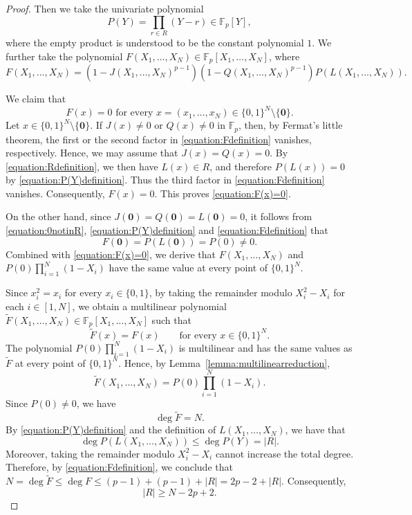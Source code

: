 \documentclass[10pt,a4paper]{amsart}
\begin{document}
\begin{proof}
Then we take the univariate polynomial
\begin{equation}\label{equation:P(Y)definition}
P(Y)=\prod_{r\in R}(Y-r)\in\mathbb F_p[Y],
\end{equation}
where the empty product is understood to be the constant polynomial $1$.
We further take the polynomial $F(X_1,\ldots,X_N) \in \mathbb{F}_p[X_1,\ldots,X_N]$, where \begin{equation}\label{equation:Fdefinition}
F(X_1,\ldots,X_N)=
\left(1-J(X_1,\ldots,X_N)^{p-1}\right)
\left(1-Q(X_1,\ldots,X_N)^{p-1}\right)
P(L(X_1,\ldots,X_N)).
\end{equation}


We claim that
\begin{equation}\label{equation:F(x)=0}
F(x)=0\mbox{ for every } x=(x_1,\ldots,x_N)\in\{0,1\}^N\setminus\{\mathbf 0\}.
\end{equation}
Let $x\in\{0,1\}^N\setminus\{\mathbf 0\}$. If $J(x)\ne0$ or
$Q(x)\ne0$ in $\mathbb F_p$, then, by Fermat's
little theorem, the first or the second factor in
\eqref{equation:Fdefinition} vanishes, respectively. Hence, we may assume that $J(x)=Q(x)=0$. By
\eqref{equation:Rdefinition}, we then have $L(x)\in R$, and therefore
$P(L(x))=0$ by \eqref{equation:P(Y)definition}. Thus the third factor
in \eqref{equation:Fdefinition} vanishes. Consequently, $F(x)=0$. This proves \eqref{equation:F(x)=0}.

On the other hand, since $J(\mathbf 0)=Q(\mathbf 0)=L(\mathbf 0)=0$, it follows from \eqref{equation:0notinR}, \eqref{equation:P(Y)definition} and \eqref{equation:Fdefinition} that $$F(\mathbf 0)=P(L(\mathbf 0))=P(0)\neq 0.$$ Combined with \eqref{equation:F(x)=0}, we derive that $F(X_1,\ldots,X_N)$ and
$P(0)\prod_{i=1}^N(1-X_i)$ have the same value at every point of
$\{0,1\}^N$.

Since $x_i^2=x_i$ for every $x_i\in\{0,1\}$, by taking the remainder modulo $X_i^2-X_i$ for each $i\in[1,N]$,
we obtain a multilinear polynomial
$\widetilde F(X_1,\ldots,X_N)\in
\mathbb F_p[X_1,\ldots,X_N]$
such that
$$\widetilde F(x)=F(x)
\qquad\text{for every }x\in\{0,1\}^N.$$
The polynomial $P(0)\prod_{i=1}^N(1-X_i)$ is multilinear and has the
same values as $\widetilde F$ at every point of $\{0,1\}^N$. Hence,
by Lemma~\ref{lemma:multilinearreduction},
$$\widetilde F(X_1,\ldots,X_N)=P(0)\prod_{i=1}^N(1-X_i).$$
Since $P(0)\ne0$, we have $$\deg\widetilde F=N.$$ By \eqref{equation:P(Y)definition} and the definition of $L(X_1,\ldots,X_N)$, we have that $$\deg P(L(X_1,\ldots,X_N))\leq \deg P(Y)=|R|.$$
Moreover, taking the remainder
modulo $X_i^2-X_i$ cannot increase the total degree. Therefore, by
\eqref{equation:Fdefinition}, we conclude that
$N=\deg\widetilde F\leq\deg F\leq(p-1)+(p-1)+|R|=2p-2+|R|$.
Consequently,
\begin{equation}\label{equation:Rbound}
|R|\ge N-2p+2.
\end{equation}



\end{proof}
\end{document}
